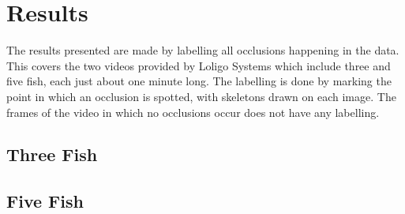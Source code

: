 \chapter{Results}
The results presented are made by labelling all occlusions happening in the data. This covers the two videos provided by Loligo Systems which include three and five fish, each just about one minute long. The labelling is done by marking the point in which an occlusion is spotted, with skeletons drawn on each image. The frames of the video in which no occlusions occur does not have any labelling.

\section{Three Fish}

\section{Five Fish}